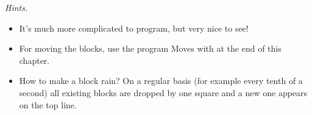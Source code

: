 \documentclass[11pt,class=report,crop=false]{standalone}
\begin{document}
\begin{activite}
\emph{Hints.} 
\begin{itemize}
  \item It's much more complicated to program, but very nice to see! 
  \item For moving the blocks, use the program \og{}Moves with \fg{} at the end of this chapter.
  \item How to make a \og{}block rain\fg{}? On a regular basis (for example every tenth of a second) all existing blocks are dropped by one square and a new one appears on the top line.
\end{itemize}
\end{activite}





\end{document}

